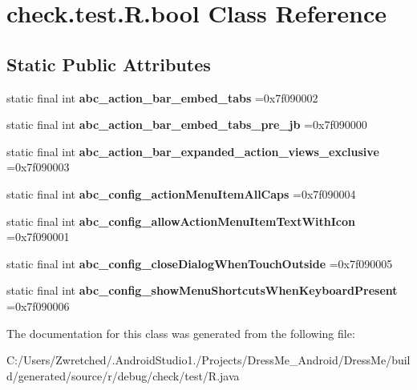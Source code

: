 \hypertarget{classcheck_1_1test_1_1_r_1_1bool}{}\section{check.\+test.\+R.\+bool Class Reference}
\label{classcheck_1_1test_1_1_r_1_1bool}
\subsection*{Static Public Attributes}
\begin{DoxyCompactItemize}
\item 
\hypertarget{classcheck_1_1test_1_1_r_1_1bool_a870b712c0b3841d0f4dc8a5a4cef3804}{}static final int {\bfseries abc\+\_\+action\+\_\+bar\+\_\+embed\+\_\+tabs} =0x7f090002\label{classcheck_1_1test_1_1_r_1_1bool_a870b712c0b3841d0f4dc8a5a4cef3804}

\item 
\hypertarget{classcheck_1_1test_1_1_r_1_1bool_a0848aa9f9d40510e01cf44ffbc0bbbbf}{}static final int {\bfseries abc\+\_\+action\+\_\+bar\+\_\+embed\+\_\+tabs\+\_\+pre\+\_\+jb} =0x7f090000\label{classcheck_1_1test_1_1_r_1_1bool_a0848aa9f9d40510e01cf44ffbc0bbbbf}

\item 
\hypertarget{classcheck_1_1test_1_1_r_1_1bool_a61f285dead60e3d7a834f12ae531166d}{}static final int {\bfseries abc\+\_\+action\+\_\+bar\+\_\+expanded\+\_\+action\+\_\+views\+\_\+exclusive} =0x7f090003\label{classcheck_1_1test_1_1_r_1_1bool_a61f285dead60e3d7a834f12ae531166d}

\item 
\hypertarget{classcheck_1_1test_1_1_r_1_1bool_acd9c8ffaa67157878808f98a731e0ec1}{}static final int {\bfseries abc\+\_\+config\+\_\+action\+Menu\+Item\+All\+Caps} =0x7f090004\label{classcheck_1_1test_1_1_r_1_1bool_acd9c8ffaa67157878808f98a731e0ec1}

\item 
\hypertarget{classcheck_1_1test_1_1_r_1_1bool_ab377ff58d5f08e77448dac5789b90f49}{}static final int {\bfseries abc\+\_\+config\+\_\+allow\+Action\+Menu\+Item\+Text\+With\+Icon} =0x7f090001\label{classcheck_1_1test_1_1_r_1_1bool_ab377ff58d5f08e77448dac5789b90f49}

\item 
\hypertarget{classcheck_1_1test_1_1_r_1_1bool_a72e8e4e4368f1f371cf995423592846c}{}static final int {\bfseries abc\+\_\+config\+\_\+close\+Dialog\+When\+Touch\+Outside} =0x7f090005\label{classcheck_1_1test_1_1_r_1_1bool_a72e8e4e4368f1f371cf995423592846c}

\item 
\hypertarget{classcheck_1_1test_1_1_r_1_1bool_a0ea4af43aa00cccd5a2676f525ab0959}{}static final int {\bfseries abc\+\_\+config\+\_\+show\+Menu\+Shortcuts\+When\+Keyboard\+Present} =0x7f090006\label{classcheck_1_1test_1_1_r_1_1bool_a0ea4af43aa00cccd5a2676f525ab0959}

\end{DoxyCompactItemize}


The documentation for this class was generated from the following file\+:\begin{DoxyCompactItemize}
\item 
C\+:/\+Users/\+Zwretched/.\+Android\+Studio1./\+Projects/\+Dress\+Me\+\_\+\+Android/\+Dress\+Me/build/generated/source/r/debug/check/test/R.\+java\end{DoxyCompactItemize}
